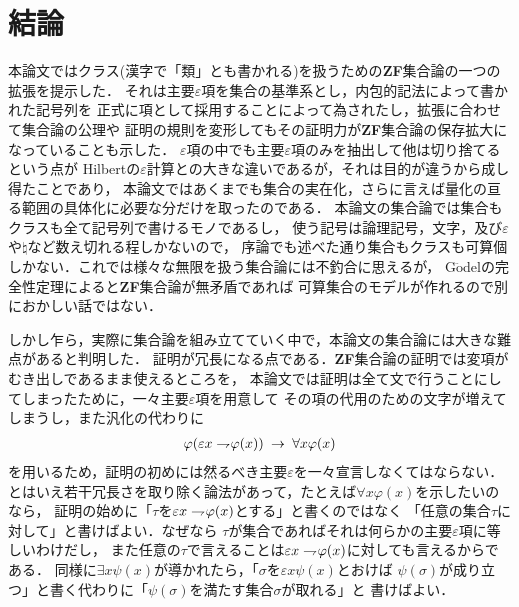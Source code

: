 \chapter{結論}
	本論文ではクラス(漢字で「類」とも書かれる)を扱うための{\bf ZF}集合論の一つの拡張を提示した．
	それは主要$\varepsilon$項を集合の基準系とし，内包的記法によって書かれた記号列を
	正式に項として採用することによって為されたし，拡張に合わせて集合論の公理や
	証明の規則を変形してもその証明力が{\bf ZF}集合論の保存拡大になっていることも示した．
	$\varepsilon$項の中でも主要$\varepsilon$項のみを抽出して他は切り捨てるという点が
	Hilbertの$\varepsilon$計算との大きな違いであるが，それは目的が違うから成し得たことであり，
	本論文ではあくまでも集合の実在化，さらに言えば量化の亘る範囲の具体化に必要な分だけを取ったのである．
	本論文の集合論では集合もクラスも全て記号列で書けるモノであるし，
	使う記号は論理記号，文字，及び$\varepsilon$や$\natural$など数え切れる程しかないので，
	序論でも述べた通り集合もクラスも可算個しかない．これでは様々な無限を扱う集合論には不釣合に思えるが，
	G$\ddot{\mbox{o}}$delの完全性定理によると{\bf ZF}集合論が無矛盾であれば
	可算集合のモデルが作れるので別におかしい話ではない．
	
	しかし乍ら，実際に集合論を組み立てていく中で，本論文の集合論には大きな難点があると判明した．
	証明が冗長になる点である．{\bf ZF}集合論の証明では変項がむき出しであるまま使えるところを，
	本論文では証明は全て文で行うことにしてしまったために，一々主要$\varepsilon$項を用意して
	その項の代用のための文字が増えてしまうし，また汎化の代わりに
	\begin{align}
		\varphi(\varepsilon x \rightharpoondown\hspace{-0.25em} \varphi(x)) \hspace{0.25em}\rightarrow\hspace{0.25em} \forall x \varphi(x)
	\end{align}
	を用いるため，証明の初めには然るべき主要$\varepsilon$を一々宣言しなくてはならない．
	とはいえ若干冗長さを取り除く論法があって，たとえば$\forall x \varphi(x)$を示したいのなら，
	証明の始めに「$\tau$を$\varepsilon x \rightharpoondown\hspace{-0.25em} \varphi(x)$とする」と書くのではなく
	「任意の集合$\tau$に対して」と書けばよい．なぜなら
	$\tau$が集合であればそれは何らかの主要$\varepsilon$項に等しいわけだし，
	また任意の$\tau$で言えることは$\varepsilon x \rightharpoondown\hspace{-0.25em} \varphi(x)$に対しても言えるからである．
	同様に$\exists x \psi(x)$が導かれたら，「$\sigma$を$\varepsilon x \psi(x)$とおけば
	$\psi(\sigma)$が成り立つ」と書く代わりに「$\psi(\sigma)$を満たす集合$\sigma$が取れる」と
	書けばよい．